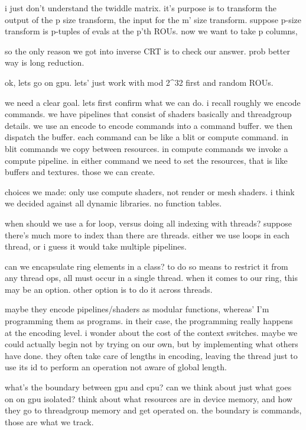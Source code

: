 i just don't understand the twiddle matrix.
it's purpose is to transform the output of the p size transform, the input for the m' size transform.
suppose p-size transform is p-tuples of evals at the p'th ROUs. now we want to take p columns, 

so the only reason we got into inverse CRT is to check our answer.
prob better way is long reduction.

ok, lets go on gpu. lets' just work with mod 2^32 first and random ROUs.



we need a clear goal.
lets first confirm what we can do.
i recall roughly we encode commands.
we have pipelines that consist of shaders basically and threadgroup details.
we use an encode to encode commands into a command buffer. we then dispatch the buffer.
each command can be like a blit or compute command.
in blit commands we copy between resources.
in compute commands we invoke a compute pipeline.
in either command we need to set the resources, that is like buffers and textures.
those we can create. 


choices we made:
only use compute shaders, not render or mesh shaders. 
i think we decided against all dynamic libraries.
no function tables.

when should we use a for loop, versus doing all indexing with threads?
suppose there's much more to index than there are threads.
either we use loops in each thread, or i guess it would take multiple pipelines.


can we encapsulate ring elements in a class?
to do so means to restrict it from any thread ops, all must occur in a single thread. 
when it comes to our ring, this may be an option. 
other option is to do it across threads.


maybe they encode pipelines/shaders as modular functions, whereas' I'm programming them as programs. 
in their case, the programming really happens at the encoding level. i wonder about the cost of the context switches. 
maybe we could actually begin not by trying on our own, but by implementing what others have done. 
they often take care of lengths in encoding, leaving the thread just to use its id to perform an operation not aware of global length.


what's the boundary between gpu and cpu? can we think about just what goes on on gpu isolated? think about what resources are in device memory, and how they go to threadgroup memory and get operated on. 
the boundary is commands, those are what we track. 

